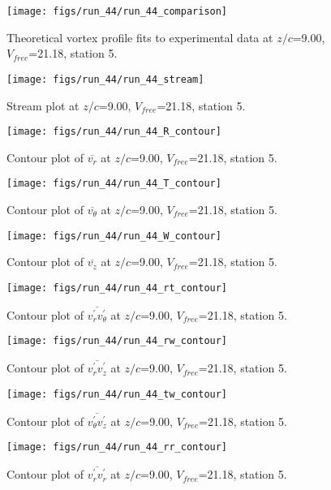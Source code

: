 \begin{figure}[H]
\centering
\texttt{[image: figs/run\_44/run\_44\_comparison]}
\caption{Theoretical vortex profile fits to experimental data at $z/c$=9.00, $V_{free}$=21.18, station 5.}
\end{figure}


\begin{figure}[H]
\centering
\texttt{[image: figs/run\_44/run\_44\_stream]}
\caption{Stream plot at $z/c$=9.00, $V_{free}$=21.18, station 5.}
\end{figure}


\begin{figure}[H]
\centering
\texttt{[image: figs/run\_44/run\_44\_R\_contour]}
\caption{Contour plot of $\overline{v_{r}}$ at $z/c$=9.00, $V_{free}$=21.18, station 5.}
\end{figure}


\begin{figure}[H]
\centering
\texttt{[image: figs/run\_44/run\_44\_T\_contour]}
\caption{Contour plot of $\overline{v_{\theta}}$ at $z/c$=9.00, $V_{free}$=21.18, station 5.}
\end{figure}


\begin{figure}[H]
\centering
\texttt{[image: figs/run\_44/run\_44\_W\_contour]}
\caption{Contour plot of $\overline{v_{z}}$ at $z/c$=9.00, $V_{free}$=21.18, station 5.}
\end{figure}


\begin{figure}[H]
\centering
\texttt{[image: figs/run\_44/run\_44\_rt\_contour]}
\caption{Contour plot of $\overline{v_{r}^{\prime} v_{\theta}^{\prime}}$ at $z/c$=9.00, $V_{free}$=21.18, station 5.}
\end{figure}


\begin{figure}[H]
\centering
\texttt{[image: figs/run\_44/run\_44\_rw\_contour]}
\caption{Contour plot of $\overline{v_{r}^{\prime} v_{z}^{\prime}}$ at $z/c$=9.00, $V_{free}$=21.18, station 5.}
\end{figure}


\begin{figure}[H]
\centering
\texttt{[image: figs/run\_44/run\_44\_tw\_contour]}
\caption{Contour plot of $\overline{v_{\theta}^{\prime} v_{z}^{\prime}}$ at $z/c$=9.00, $V_{free}$=21.18, station 5.}
\end{figure}


\begin{figure}[H]
\centering
\texttt{[image: figs/run\_44/run\_44\_rr\_contour]}
\caption{Contour plot of $\overline{v_{r}^{\prime} v_{r}^{\prime}}$ at $z/c$=9.00, $V_{free}$=21.18, station 5.}
\end{figure}


